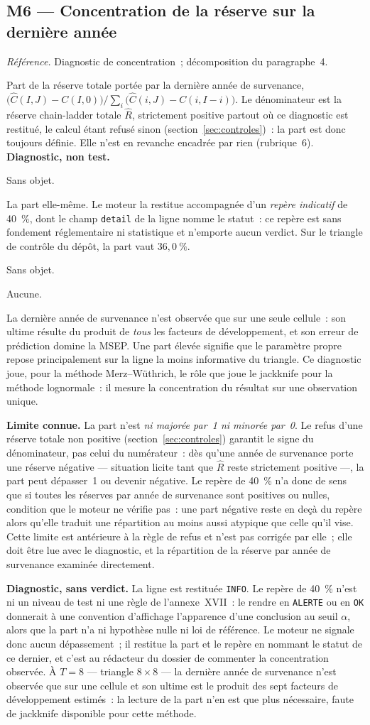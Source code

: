 \documentclass[a4paper,11pt]{article}
\newcommand{\code}[1]{\texttt{\small #1}}
\newcommand{\refl}[1]{{\small\textcolor{maincolor!70!black}{\textit{Référence.} #1}}\par\smallskip}
\newcounter{ficheid}
\newenvironment{fiche}[1]{%
  \stepcounter{ficheid}%
  \phantomsection
  \subsection{#1}%
  \label{fiche:\theficheid}%
}{%
  \end{description}\vspace{0.5em}%
}
\newcommand{\Cadre}{%
  \begin{description}[leftmargin=0pt, style=unboxed, itemsep=3pt, topsep=3pt, parsep=2pt]%
  \item[\textcolor{financeblue}{\textbf{1. Cadre, notations et hypothèses de validité (non testées).}}]}
\newcommand{\Hzero}{\item[\textcolor{financeblue}{\textbf{2. Hypothèse nulle.}}]}
\newcommand{\Stat}{\item[\textcolor{financeblue}{\textbf{3. Statistique de test.}}]}
\newcommand{\Loi}{\item[\textcolor{financeblue}{\textbf{4. Loi sous $H_0$.}}]}
\newcommand{\Pval}{\item[\textcolor{financeblue}{\textbf{5. p-value.}}]}
\newcommand{\Usage}{\item[\textcolor{financeblue}{\textbf{6. Usage et limites.}}]}
\begin{document}
\begin{fiche}{M6 --- Concentration de la réserve sur la dernière année}
\label{mw:m6conc}
\refl{Diagnostic de concentration~; décomposition du paragraphe~4.}
\Cadre
Part de la réserve totale portée par la dernière année de survenance,
$\big(\hat C(I,J) - C(I,0)\big) / \sum_i \big(\hat C(i,J) - C(i,I-i)\big)$. Le
dénominateur est la réserve chain-ladder totale $\hat R$, strictement positive
partout où ce diagnostic est restitué, le calcul étant refusé sinon
(section~\ref{sec:controles})~: la part est donc toujours définie. Elle n'est en
revanche encadrée par rien (rubrique~6). \textbf{Diagnostic, non test.}
\Hzero
Sans objet.
\Stat
La part elle-même. Le moteur la restitue accompagnée d'un \emph{repère
indicatif} de 40~\%, dont le champ \code{detail} de la ligne nomme le statut~:
ce repère est sans fondement réglementaire ni statistique et n'emporte aucun
verdict. Sur le triangle de contrôle du dépôt, la part vaut $36{,}0~\%$.
\Loi
Sans objet.
\Pval
Aucune.
\Usage
La dernière année de survenance n'est observée que sur une seule cellule~: son
ultime résulte du produit de \emph{tous} les facteurs de développement, et son
erreur de prédiction domine la MSEP. Une part élevée signifie que le paramètre
propre repose principalement sur la ligne la moins informative du triangle. Ce
diagnostic joue, pour la méthode Merz--Wüthrich, le rôle que joue le jackknife
pour la méthode lognormale~: il mesure la concentration du résultat sur une
observation unique.

\textbf{Limite connue.} La part n'est \emph{ni majorée par~1 ni minorée par~0}.
Le refus d'une réserve totale non positive (section~\ref{sec:controles}) garantit
le signe du dénominateur, pas celui du numérateur~: dès qu'une année de
survenance porte une réserve négative --- situation licite tant que $\hat R$
reste strictement positive ---, la part peut dépasser~1 ou devenir négative. Le
repère de 40~\% n'a donc de sens que si toutes les réserves par année de
survenance sont positives ou nulles, condition que le moteur ne vérifie pas~:
une part négative reste en deçà du repère alors qu'elle traduit une répartition
au moins aussi atypique que celle qu'il vise. Cette limite est antérieure à la
règle de refus et n'est pas corrigée par elle~; elle doit être lue avec le
diagnostic, et la répartition de la réserve par année de survenance examinée
directement.

\medskip
\textbf{Diagnostic, sans verdict.} La ligne est restituée \code{INFO}. Le repère
de 40~\% n'est ni un niveau de test ni une règle de l'annexe~XVII~: le rendre en
\code{ALERTE} ou en \code{OK} donnerait à une convention d'affichage l'apparence
d'une conclusion au seuil $\alpha$, alors que la part n'a ni hypothèse nulle ni
loi de référence. Le moteur ne signale donc aucun dépassement~; il restitue la
part et le repère en nommant le statut de ce dernier, et c'est au rédacteur du
dossier de commenter la concentration observée. À $T = 8$ --- triangle
$8\times8$ --- la dernière année de survenance n'est observée que sur une
cellule et son ultime est le produit des sept facteurs de développement
estimés~: la lecture de la part n'en est que plus nécessaire, faute de
jackknife disponible pour cette méthode.
\end{fiche}
\end{document}

